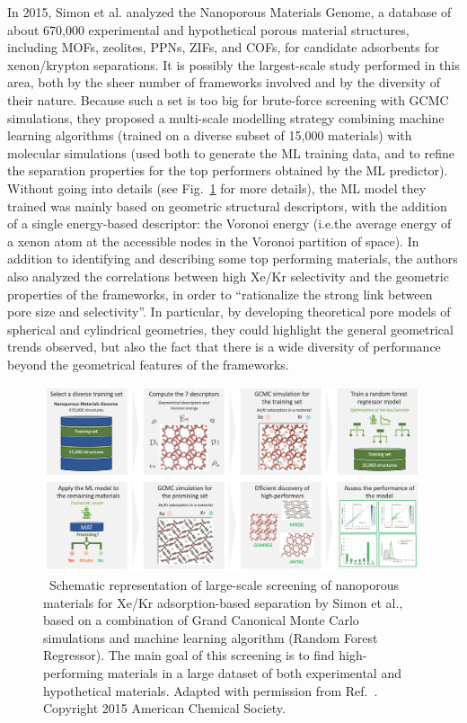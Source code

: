 \documentclass[main.tex]{subfiles}
\begin{document}
In 2015, Simon et al.\cite{Simon_2015} analyzed the Nanoporous Materials Genome,\cite{Simon_2015_EES, Boyd_2017} a database of about 670,000 experimental and hypothetical porous material structures, including MOFs, zeolites, PPNs, ZIFs, and COFs, for candidate adsorbents for xenon/krypton separations. It is possibly the largest-scale study performed in this area, both by the sheer number of frameworks involved and by the diversity of their nature. Because such a set is too big for brute-force screening with GCMC simulations, they proposed a multi-scale modelling strategy combining machine learning algorithms (trained on a diverse subset of 15,000 materials) with molecular simulations (used both to generate the ML training data, and to refine the separation properties for the top performers obtained by the ML predictor). Without going into details (see Fig.~\ref{fgr:Simon} for more details), the ML model they trained was mainly based on geometric structural descriptors, with the addition of a single energy-based descriptor: the Voronoi energy (i.e.the average energy of a xenon atom at the accessible nodes in the Voronoi partition of space). In addition to identifying and describing some top performing materials, the authors also analyzed the correlations between high Xe/Kr selectivity and the geometric properties of the frameworks, in order to ``rationalize the strong link between pore size and selectivity''. In particular, by developing theoretical pore models of spherical and cylindrical geometries, they could highlight the general geometrical trends observed, but also the fact that there is a wide diversity of performance beyond the geometrical features of the frameworks.

\begin{figure}[t]
    \centering
    \includegraphics[width=0.99\textwidth]{figures/1-screening/Simon.jpg}
    \caption{\ Schematic representation of large-scale screening of nanoporous materials for Xe/Kr adsorption-based separation by Simon et al.,\cite{Simon_2015} based on a combination of Grand Canonical Monte Carlo simulations and machine learning algorithm (Random Forest Regressor). The main goal of this screening is to find high-performing materials in a large dataset of both experimental and hypothetical materials. 
    Adapted with permission from Ref.~. Copyright 2015 American Chemical Society.
    }\label{fgr:Simon}
\end{figure}
\end{document}
